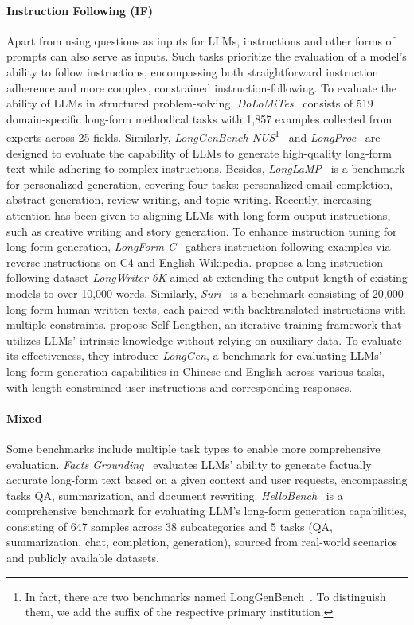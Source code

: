 \documentclass[11pt, a4paper, logo, copyright, nonumbering]{map}
\begin{document}
\paragraph{Instruction Following (IF)} 
Apart from using questions as inputs for LLMs, instructions and other forms of prompts can also serve as inputs. Such tasks prioritize the evaluation of a model's ability to follow instructions, encompassing both straightforward instruction adherence and more complex, constrained instruction-following.
To evaluate the ability of LLMs in structured problem-solving, \textit{DoLoMiTes}~\citep{malaviya2024dolomites} consists of 519 domain-specific long-form methodical tasks with 1,857 examples collected from experts across 25 fields. 
Similarly, \textit{LongGenBench-NUS}\footnote{In fact, there are two benchmarks named LongGenBench~\citep{wu2024longgenbench, liu2024longgenbench}. To distinguish them, we add the suffix of the respective primary institution.}~\citep{wu2024longgenbench} and \textit{LongProc}~\citep{ye2025longproc} are designed to evaluate the capability of LLMs to generate high-quality long-form text while adhering to complex instructions.
Besides, \textit{LongLaMP}~\citep{kumar2024longlamp} is a benchmark for personalized generation, covering four tasks: personalized email completion, abstract generation, review writing, and topic writing. 
Recently, increasing attention has been given to aligning LLMs with long-form output instructions, such as creative writing and story generation. To enhance instruction tuning for long-form generation, \textit{LongForm-C}~\citep{koksal2023longform} gathers instruction-following examples via reverse instructions on C4 and English Wikipedia. \citet{bai2024longwriter} propose a long instruction-following dataset \textit{LongWriter-6K} aimed at extending the output length of existing models to over 10,000 words. 
Similarly, \textit{Suri}~\citep{pham2024suri} is a benchmark consisting of 20,000 long-form human-written texts, each paired with backtranslated instructions with multiple constraints. \citet{quan2024language} propose Self-Lengthen, an iterative training framework that utilizes LLMs' intrinsic knowledge without relying on auxiliary data. To evaluate its effectiveness, they introduce \textit{LongGen}, a benchmark for evaluating LLMs' long-form generation capabilities in Chinese and English across various tasks, with length-constrained user instructions and corresponding responses. 

\paragraph{Mixed} Some benchmarks include multiple task types to enable more comprehensive evaluation. \textit{Facts Grounding}~\citep{jacovi2025facts} evaluates LLMs' ability to generate factually accurate long-form text based on a given context and user requests, encompassing tasks QA, summarization, and document rewriting. \textit{HelloBench}~\citep{que2024hellobench} is a comprehensive benchmark for evaluating LLM's long-form generation capabilities, consisting of 647 samples across 38 subcategories and 5 tasks (QA, summarization, chat, completion, generation), sourced from real-world scenarios and publicly available datasets.
\end{document}
